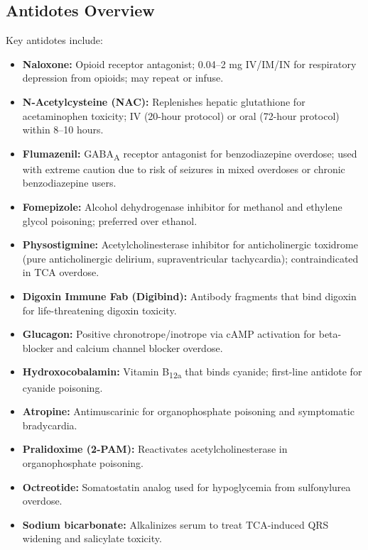 \subsection{Antidotes Overview}
\label{sec:Antidotes Overview}
Key antidotes include:
\begin{itemize}[noitemsep]
  \item \textbf{Naloxone:} Opioid receptor antagonist; 0.04--2 mg IV/IM/IN for respiratory depression from opioids; may repeat or infuse.
  \item \textbf{N-Acetylcysteine (NAC):} Replenishes hepatic glutathione for acetaminophen toxicity; IV (20-hour protocol) or oral (72-hour protocol) within 8--10 hours.
  \item \textbf{Flumazenil:} GABA\textsubscript{A} receptor antagonist for benzodiazepine overdose; used with extreme caution due to risk of seizures in mixed overdoses or chronic benzodiazepine users.
  \item \textbf{Fomepizole:} Alcohol dehydrogenase inhibitor for methanol and ethylene glycol poisoning; preferred over ethanol.
  \item \textbf{Physostigmine:} Acetylcholinesterase inhibitor for anticholinergic toxidrome (pure anticholinergic delirium, supraventricular tachycardia); contraindicated in TCA overdose.
  \item \textbf{Digoxin Immune Fab (Digibind):} Antibody fragments that bind digoxin for life-threatening digoxin toxicity.
  \item \textbf{Glucagon:} Positive chronotrope/inotrope via cAMP activation for beta-blocker and calcium channel blocker overdose.
  \item \textbf{Hydroxocobalamin:} Vitamin B\textsubscript{12a} that binds cyanide; first-line antidote for cyanide poisoning.
  \item \textbf{Atropine:} Antimuscarinic for organophosphate poisoning and symptomatic bradycardia.
  \item \textbf{Pralidoxime (2-PAM):} Reactivates acetylcholinesterase in organophosphate poisoning.
  \item \textbf{Octreotide:} Somatostatin analog used for hypoglycemia from sulfonylurea overdose.
  \item \textbf{Sodium bicarbonate:} Alkalinizes serum to treat TCA-induced QRS widening and salicylate toxicity.
\end{itemize}


